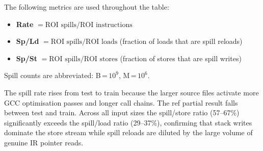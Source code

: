 \documentclass[conference]{IEEEtran}
\begin{document}
The following metrics are used throughout the table:
\begin{itemize}
    \item \textbf{Rate} $= \text{ROI spills} / \text{ROI instructions}$
    \item \textbf{Sp/Ld} $= \text{ROI spills} / \text{ROI loads}$ \quad (fraction of loads that are spill reloads)
    \item \textbf{Sp/St} $= \text{ROI spills} / \text{ROI stores}$ \quad (fraction of stores that are spill writes)
\end{itemize}
Spill counts are abbreviated: B\,=\,$10^9$, M\,=\,$10^6$.

\begin{table}[H]
\centering
\caption{502.gcc\_r --- All Runs Across Input Sizes}
\label{tab:summary}
\end{table}

The spill rate rises from test to train because the larger source
files activate more GCC optimisation passes and longer call chains.
The ref partial result falls between test and train. Across all
input sizes the spill/store ratio (57--67\%) significantly exceeds
the spill/load ratio (29--37\%), confirming that stack writes dominate
the store stream while spill reloads are diluted by the large volume
of genuine IR pointer reads.
\end{document}
